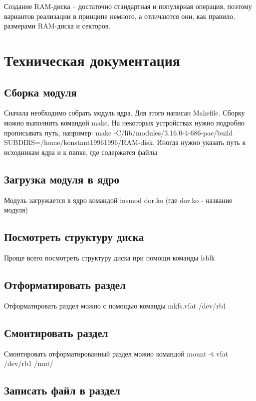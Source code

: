 \documentclass[11pt]{article}
\begin{document}
Создание RAM-диска – достаточно стандартная и популярная операция, поэтому вариантов реализации в принципе немного, а отличаются они, как правило, размерами RAM-диска и секторов.

\section{Техническая документация}

\subsection{Сборка модуля}

Сначала необходимо собрать модуль ядра. Для этого написан Makefile. Сборку можно выполнить командой make. На некоторых устройствах нужно подробно прописывать путь, например: 
make -C/lib/modules/3.16.0-4-686-pae/build SUBDIRS=/home/konstant19961996/RAM-disk. Иногда нужно указать путь к исходникам ядра и к папке, где содержатся файлы

\subsection{Загрузка модуля в ядро}

Модуль загружается в ядро командой insmod dor.ko (где dor.ko - название модуля)

\subsection{Посмотреть структуру диска}

Проще всего посмотреть структуру диска при помощи команды lsblk

\subsection{Отформатировать раздел}

Отформатировать раздел можно с помощью команды mkfs.vfat /dev/rb1

\subsection{Смонтировать раздел}

Смонтировать отформатированный раздел можно командой mount -t vfat /dev/rb1 /mnt/

\subsection{Записать файл в раздел}
\end{document}
